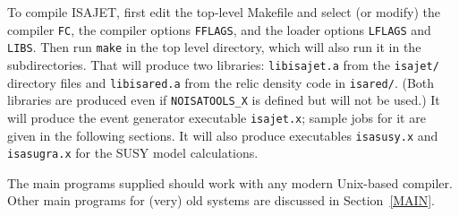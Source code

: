 To compile ISAJET, first edit the top-level Makefile and select (or
modify) the compiler \verb|FC|, the compiler options \verb|FFLAGS|, and
the loader options \verb|LFLAGS| and \verb|LIBS|. Then run \verb|make|
in the top level directory, which will also run it in the
subdirectories. That will produce two libraries: \verb|libisajet.a| from
the \verb|isajet/| directory files and \verb|libisared.a| from the
relic density code in \verb|isared/|. (Both libraries are produced even
if \verb|NOISATOOLS_X| is defined but will not be used.) It will produce
the event generator executable \verb|isajet.x|; sample jobs for it are
given in the following sections. It will also produce executables
\verb|isasusy.x| and \verb|isasugra.x| for the SUSY model calculations.

The main programs supplied should work with any modern Unix-based compiler.
Other main programs for (very) old systems are discussed in
Section~\ref{MAIN}.
